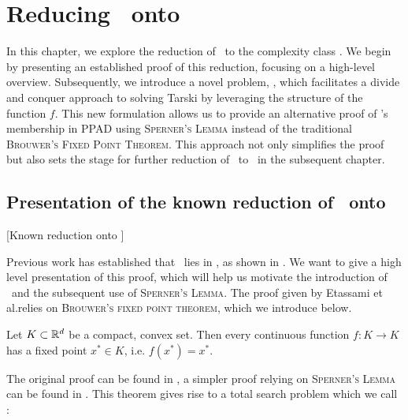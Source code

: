 \setchapterpreamble[u]{\margintoc}
\chapter{Reducing \Tarski\ onto \PPAD}

In this chapter, we explore the reduction of \Tarski\ to the complexity class \PPAD. We begin by presenting an established proof of this reduction, focusing on a high-level overview. Subsequently, we introduce a novel problem, \Tarskistar, which facilitates a divide and conquer approach to solving Tarski by leveraging the structure of the function $f$. This new formulation allows us to provide an alternative proof of \Tarski’s membership in PPAD using \textsc{Sperner's Lemma} instead of the traditional \textsc{Brouwer's Fixed Point Theorem}. This approach not only simplifies the proof but also sets the stage for further reduction of \Tarskistar\ to \EOPL\ in the subsequent chapter.

\section{Presentation of the known reduction of \Tarski\ onto \PPAD}[Known reduction onto \PPAD]

Previous work has established that \Tarski\ lies in \PPAD, as shown in . We want to give a high level presentation of this proof, which will help us motivate the introduction of \Tarskistar\ and the subsequent use of \textsc{Sperner's Lemma}. The proof given by Etassami et al.\@ relies on \textsc{Brouwer's fixed point theorem}, which we introduce below.

\begin{theorem}
    Let $K \subset \mathbb{R}^d$ be a compact, convex set. Then every continuous function $f : K \rightarrow K$ has a fixed point $x^*	\in K$, i.e. $f(x^*) = x^*$.
\end{theorem}

The original proof can be found in , a simpler proof relying on \textsc{Sperner's Lemma} can be found in . This theorem gives rise to a total search problem which we call \Brouwer:


